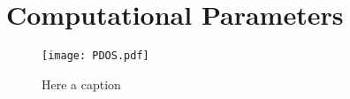 \appendix
\chapter{Computational Parameters} %
\label{AppendixB} %


\begin{figure}[h]
    \centering
    \texttt{[image: PDOS.pdf]}
    \caption{
        Here a caption 
    }
    \label{fig:pdos-all}
\end{figure}

